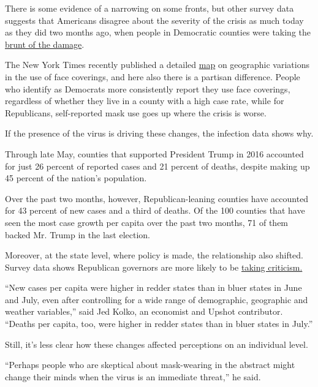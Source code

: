 There is some evidence of a narrowing on some fronts, but other survey
data suggests that Americans disagree about the severity of the crisis
as much today as they did two months ago, when people in Democratic
counties were taking the
\href{https://www.nytimes.com/2020/05/25/us/politics/coronavirus-red-blue-states.html}{brunt
of the damage}.

The New York Times recently published a detailed
\href{https://www.nytimes.com/interactive/2020/07/17/upshot/coronavirus-face-mask-map.html}{map}
on geographic variations in the use of face coverings, and here also
there is a partisan difference. People who identify as Democrats more
consistently report they use face coverings, regardless of whether they
live in a county with a high case rate, while for Republicans,
self-reported mask use goes up where the crisis is worse.

If the presence of the virus is driving these changes, the infection
data shows why.

Through late May, counties that supported President Trump in 2016
accounted for just 26 percent of reported cases and 21 percent of
deaths, despite making up 45 percent of the nation's population.

Over the past two months, however, Republican-leaning counties have
accounted for 43 percent of new cases and a third of deaths. Of the 100
counties that have seen the most case growth per capita over the past
two months, 71 of them backed Mr. Trump in the last election.

Moreover, at the state level, where policy is made, the relationship
also shifted. Survey data shows Republican governors are more likely to
be
\href{https://fivethirtyeight.com/features/americans-increasingly-dislike-how-republican-governors-are-handling-the-coronavirus-outbreak/}{taking
criticism.}

``New cases per capita were higher in redder states than in bluer states
in June and July, even after controlling for a wide range of
demographic, geographic and weather variables,'' said Jed Kolko, an
economist and Upshot contributor. ``Deaths per capita, too, were higher
in redder states than in bluer states in July.''

Still, it's less clear how these changes affected perceptions on an
individual level.

``Perhaps people who are skeptical about mask-wearing in the abstract
might change their minds when the virus is an immediate threat,'' he
said.

